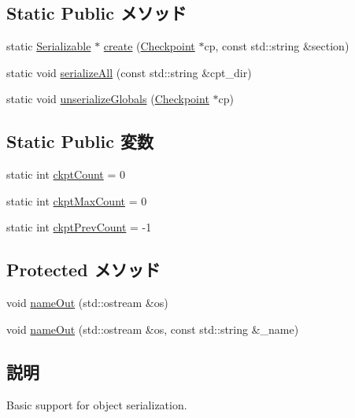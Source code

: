\subsection*{Static Public メソッド}
\begin{DoxyCompactItemize}
\item 
static \hyperlink{classSerializable}{Serializable} $\ast$ \hyperlink{classSerializable_aeba0ff4f3274e6aa0886adc5af90e371}{create} (\hyperlink{classCheckpoint}{Checkpoint} $\ast$cp, const std::string \&section)
\item 
static void \hyperlink{classSerializable_a7567acc85b8d8dbf0d1372dc9e1f7ef8}{serializeAll} (const std::string \&cpt\_\-dir)
\item 
static void \hyperlink{classSerializable_a26aaa7facb37dfe9ef4c39b082978ef9}{unserializeGlobals} (\hyperlink{classCheckpoint}{Checkpoint} $\ast$cp)
\end{DoxyCompactItemize}
\subsection*{Static Public 変数}
\begin{DoxyCompactItemize}
\item 
static int \hyperlink{classSerializable_ad9584d823bbe23fb3371f48784a2f006}{ckptCount} = 0
\item 
static int \hyperlink{classSerializable_ad24cc9cedf2420163221d12e446590e0}{ckptMaxCount} = 0
\item 
static int \hyperlink{classSerializable_aea546c19c209316cc2c1565550701211}{ckptPrevCount} = -\/1
\end{DoxyCompactItemize}
\subsection*{Protected メソッド}
\begin{DoxyCompactItemize}
\item 
void \hyperlink{classSerializable_a02882ba301442518e82872ad4574a3f0}{nameOut} (std::ostream \&os)
\item 
void \hyperlink{classSerializable_a740e60580ab34c52937682fd5b21f2b5}{nameOut} (std::ostream \&os, const std::string \&\_\-name)
\end{DoxyCompactItemize}


\subsection{説明}
Basic support for object serialization.

